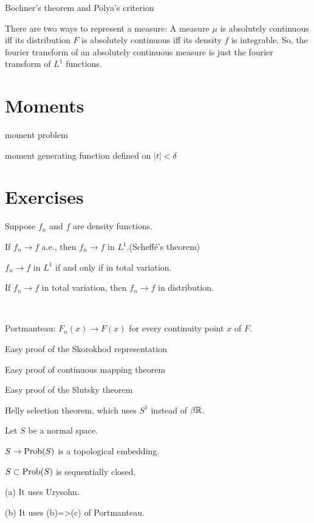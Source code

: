 \documentclass{../../large}
\begin{document}
\begin{prb}
Bochner's theorem and Polya's criterion
\end{prb}


There are two ways to represent a measure:
A measure $\mu$ is absolutely continuous iff its distribution $F$ is absolutely continuous iff its density $f$ is integrable.
So, the fourier transform of an absolutely continuous measure is just the fourier transform of $L^1$ functions.



\section{Moments}

moment problem

moment generating function defined on $|t|<\delta$


\section*{Exercises}


\begin{prb}
Suppose $f_n$ and $f$ are density functions.
\begin{parts}
\item If $f_n\to f$ a.e., then $f_n\to f$ in $L^1$.\hfill(Scheff\'e's theorem)
\item $f_n\to f$ in $L^1$ if and only if in total variation.
\item If $f_n\to f$ in total variation, then $f_n\to f$ in distribution.
\end{parts}
\end{prb}

\begin{prb}\,
\begin{parts}
\item Portmanteau: 
$F_n(x)\to F(x)$ for every continuity point $x$ of $F$.
\item Easy proof of the Skorokhod representation
\item Easy proof of continuous mapping theorem
\item Easy proof of the Slutsky theorem
\item Helly selection theorem, which uses $S^1$ instead of $\beta\mathbb{R}$.
\end{parts}
\end{prb}

\begin{prb}
Let $S$ be a normal space.
\begin{parts}
\item $S\to\operatorname{Prob}(S)$ is a topological embedding.
\item $S\subset\operatorname{Prob}(S)$ is sequentially closed.
\item %
\end{parts}
\end{prb}
\begin{pf}
(a)
It uses Urysohn.

(b)
It uses (b)=>(c) of Portmanteau.
\end{pf}
\end{document}
